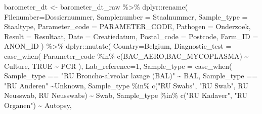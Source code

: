 \documentclass[
]{article}
\newenvironment{Shaded}{\begin{snugshade}}{\end{snugshade}}
\newcommand{\AttributeTok}[1]{\textcolor[rgb]{0.77,0.63,0.00}{#1}}
\newcommand{\ConstantTok}[1]{\textcolor[rgb]{0.00,0.00,0.00}{#1}}
\newcommand{\FunctionTok}[1]{\textcolor[rgb]{0.00,0.00,0.00}{#1}}
\newcommand{\NormalTok}[1]{#1}
\newcommand{\OtherTok}[1]{\textcolor[rgb]{0.56,0.35,0.01}{#1}}
\newcommand{\SpecialCharTok}[1]{\textcolor[rgb]{0.00,0.00,0.00}{#1}}
\newcommand{\StringTok}[1]{\textcolor[rgb]{0.31,0.60,0.02}{#1}}
\begin{document}
\begin{Shaded}
\begin{Highlighting}[]
\NormalTok{barometer\_dt }\OtherTok{\textless{}{-}}\NormalTok{ barometer\_dt\_raw }\SpecialCharTok{\%\textgreater{}\%} 
\NormalTok{  dplyr}\SpecialCharTok{::}\FunctionTok{rename}\NormalTok{(}
    \AttributeTok{Filenumber=}\NormalTok{Dossiernummer, }
    \AttributeTok{Samplenumber =}\NormalTok{ Staalnummer,}
    \AttributeTok{Sample\_type =}\NormalTok{ Staaltype,}
    \AttributeTok{Parameter\_code =}\NormalTok{ PARAMETER\_CODE,}
    \AttributeTok{Pathogen =}\NormalTok{ Onderzoek,}
    \AttributeTok{Result =}\NormalTok{ Resultaat,}
    \AttributeTok{Date =}\NormalTok{ Creatiedatum,}
    \AttributeTok{Postal\_code =}\NormalTok{ Postcode, }
    \AttributeTok{Farm\_ID =}\NormalTok{ ANON\_ID}
\NormalTok{    ) }\SpecialCharTok{\%\textgreater{}\%}
\NormalTok{  dplyr}\SpecialCharTok{::}\FunctionTok{mutate}\NormalTok{(}
    \AttributeTok{Country=}\StringTok{\textquotesingle{}Belgium\textquotesingle{}}\NormalTok{,}
    \AttributeTok{Diagnostic\_test =} \FunctionTok{case\_when}\NormalTok{(}
\NormalTok{      Parameter\_code }\SpecialCharTok{\%in\%} \FunctionTok{c}\NormalTok{(}\StringTok{\textquotesingle{}BAC\_AERO\textquotesingle{}}\NormalTok{,}\StringTok{\textquotesingle{}BAC\_MYCOPLASMA\textquotesingle{}}\NormalTok{) }\SpecialCharTok{\textasciitilde{}} \StringTok{\textquotesingle{}Culture\textquotesingle{}}\NormalTok{,}
      \ConstantTok{TRUE} \SpecialCharTok{\textasciitilde{}} \StringTok{\textquotesingle{}PCR\textquotesingle{}}
\NormalTok{    ),}
    \AttributeTok{Lab\_reference=}\StringTok{\textquotesingle{}1\textquotesingle{}}\NormalTok{, }
    \AttributeTok{Sample\_type =} \FunctionTok{case\_when}\NormalTok{(}
\NormalTok{      Sample\_type }\SpecialCharTok{==} \StringTok{"RU Broncho{-}alveolar lavage (BAL)"} \SpecialCharTok{\textasciitilde{}} \StringTok{\textquotesingle{}BAL\textquotesingle{}}\NormalTok{, }
\NormalTok{      Sample\_type }\SpecialCharTok{==} \StringTok{"RU Anderen"} \SpecialCharTok{\textasciitilde{}}\StringTok{\textquotesingle{}Unknown\textquotesingle{}}\NormalTok{,}
\NormalTok{      Sample\_type }\SpecialCharTok{\%in\%} \FunctionTok{c}\NormalTok{(}\StringTok{"RU Swabs"}\NormalTok{, }\StringTok{"RU Swab"}\NormalTok{, }\StringTok{\textquotesingle{}RU Neusswab\textquotesingle{}}\NormalTok{, }\StringTok{\textquotesingle{}RU Neusswabs\textquotesingle{}}\NormalTok{) }\SpecialCharTok{\textasciitilde{}} \StringTok{\textquotesingle{}Swab\textquotesingle{}}\NormalTok{,}
\NormalTok{      Sample\_type }\SpecialCharTok{\%in\%} \FunctionTok{c}\NormalTok{(}\StringTok{"RU Kadaver"}\NormalTok{, }\StringTok{"RU Organen"}\NormalTok{) }\SpecialCharTok{\textasciitilde{}} \StringTok{\textquotesingle{}Autopsy\textquotesingle{}}\NormalTok{,}

\end{Highlighting}
\end{Shaded}
\end{document}
